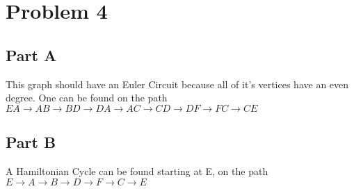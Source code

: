 \documentclass[11pt]{article}
\begin{document}
\section*{Problem 4}
\subsection*{Part A}
This graph should have an Euler Circuit because all of it's vertices have an even degree. One can be found on the path $EA \rightarrow AB \rightarrow BD \rightarrow DA \rightarrow AC \rightarrow CD \rightarrow DF \rightarrow FC \rightarrow CE$

\subsection*{Part B}
A Hamiltonian Cycle can be found starting at E, on the path $E \rightarrow A \rightarrow B \rightarrow D \rightarrow F \rightarrow C \rightarrow E$
\end{document}
